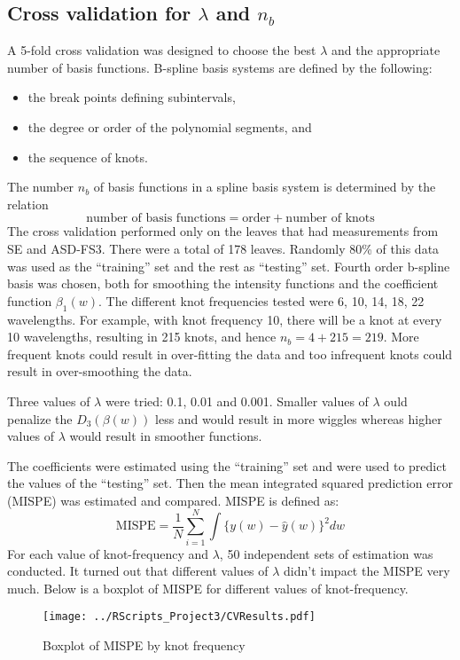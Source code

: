 \subsection*{Cross validation for $\lambda$ and $n_b$}
A 5-fold cross validation was designed to choose the best $\lambda$ and the appropriate number of basis functions. B-spline basis systems are defined by the following:
\begin{itemize}
\item the break points defining subintervals,
\item the degree or order of the polynomial segments, and
\item the sequence of knots.
\end{itemize}
The number $n_b$ of basis functions in a spline basis system is determined by the relation
\[ \text{number of basis functions} = \text{order} + \text{number of knots} \]
The cross validation performed only on the leaves that had measurements from SE and ASD-FS3. There were a total of 178 leaves. Randomly 80\% of this data was used as the ``training'' set and the rest as ``testing'' set. Fourth order b-spline basis was chosen, both for smoothing the intensity functions and the coefficient function $\beta_1(w)$. The different knot frequencies tested were 6, 10, 14, 18, 22 wavelengths. For example, with knot frequency 10, there will be a knot at every 10 wavelengths, resulting in 215 knots, and hence $n_b = 4 + 215 = 219$. More frequent knots could result in over-fitting the data and too infrequent knots could result in over-smoothing the data.

Three values of $\lambda$ were tried: 0.1, 0.01 and 0.001. Smaller values of $\lambda$ ould penalize the $D_3(\beta(w))$ less and would result in more wiggles whereas higher values of $\lambda$ would result in smoother functions.

The coefficients were estimated using the ``training'' set and were used to predict the values of the ``testing'' set. Then the mean integrated squared prediction error (MISPE) was estimated and compared. MISPE is defined as:
\begin{equation}
\text{MISPE} = \frac{1}{N} \sum \limits_{i = 1} ^{N} \int \{y(w) - \hat{y}(w)\}^2dw
\end{equation}
For each value of knot-frequency and $\lambda$, 50 independent sets of estimation was conducted. It turned out that different values of $\lambda$ didn't impact the MISPE very much. Below is a boxplot of MISPE for different values of knot-frequency. 

\begin{figure}[H]
\centering
\texttt{[image: ../RScripts\_Project3/CVResults.pdf]}
\caption{Boxplot of MISPE by knot frequency}
\label{fig:Fig3.1}
\end{figure}

